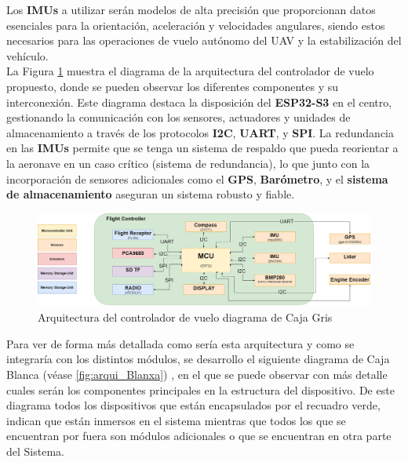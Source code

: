 Los \textbf{IMUs} a utilizar serán modelos de alta precisión que proporcionan datos esenciales para la orientación, aceleración y velocidades angulares, siendo estos necesarios para las operaciones de vuelo autónomo del UAV y la estabilización del vehículo.
\\
La Figura \ref{fig:arqui_controlador} muestra el diagrama de la arquitectura del controlador de vuelo propuesto, donde se pueden observar los diferentes componentes y su interconexión. Este diagrama destaca la disposición del \textbf{ESP32-S3} en el centro, gestionando la comunicación con los sensores, actuadores y unidades de almacenamiento a través de los protocolos \textbf{I2C}, \textbf{UART}, y \textbf{SPI}. La redundancia en las \textbf{IMUs} permite que se tenga un sistema de respaldo que pueda reorientar a la aeronave en un caso crítico (sistema de redundancia), lo que junto con la incorporación de sensores adicionales como el \textbf{GPS}, \textbf{Barómetro}, y el \textbf{sistema de almacenamiento} aseguran un sistema robusto y fiable.


\vspace{5 px}


\begin{figure}[H]
    \centering
    \includegraphics[width=\textwidth]{Imagenes/Metodologia/arquitectura_controlador.png}
    \caption{Arquitectura del controlador de vuelo diagrama de Caja Gris }
    \label{fig:arqui_controlador}
\end{figure}

Para ver de forma más detallada como sería esta arquitectura y como se integraría con los distintos módulos, se desarrollo el siguiente diagrama de Caja Blanca (véase \ref{fig:arqui_Blanxa}) , en el que se puede observar con más detalle cuales serán los componentes principales en la estructura del dispositivo. De este diagrama todos los dispositivos que están encapsulados por el recuadro verde, indican que están inmersos en el sistema mientras que todos los que se encuentran por fuera son módulos adicionales o que se encuentran en otra parte del Sistema.

